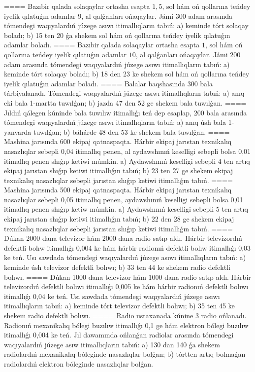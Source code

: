 ====
Bazıbir qalada solaqaylar ortasha esapta $1,5$, sol hám oń qollarına teńdey iyelik qılatuǵın adamlar $9$, al qalǵanları ońaqaylar. Jámi 300 adam arasında tómendegi waqıyalardıń júzege asıwı itimallıqların tabıń: a) keminde tórt solaqay boladı; b) 15 ten 20 ǵa shekem sol hám oń qollarına teńdey iyelik qılatuǵın adamlar boladı.
====
Bazıbir qalada solaqaylar ortasha esapta $1$, sol hám oń qollarına teńdey iyelik qılatuǵın adamlar $10$, al qalǵanları ońaqaylar. Jámi 200 adam arasında tómendegi waqıyalardıń júzege asıwı itimallıqların tabıń: a) keminde tórt solaqay boladı; b) 18 den 23 ke shekem sol hám oń qollarına teńdey iyelik qılatuǵın adamlar boladı.
====
Balalar baqshasında 300 bala tárbiyalanadı. Tómendegi waqıyalardıń júzege asıwı itimallıqların tabıń: a) anıq eki bala 1-martta tuwılǵan; b) jazda 47 den 52 ge shekem bala tuwılǵan.
====
Jıldıń qálegen kúninde bala tuwılıw itimallıǵı teń dep esaplap, 200 bala arasında tómendegi waqıyalardıń júzege asıwı itimallıqların tabıń: a) anıq úsh bala 1-yanvarda tuwılǵan; b) báhárde 48 den 53 ke shekem bala tuwılǵan.
====
Mashina jarısında 600 ekipaj qatnaspaqta. Hárbir ekipaj jarıstan texnikalıq nasazlıqlar sebepli 0,04 itimallıq penen, al aydawshınıń keselligi sebepli bolsa 0,01 itimallıq penen shıǵıp ketiwi múmkin. a) Aydawshınıń keselligi sebepli 4 ten artıq ekipaj jarıstan shıǵıp ketiwi itimallıǵın tabıń; b) 23 ten 27 ge shekem ekipaj texnikalıq nasazlıqlar sebepli jarıstan shıǵıp ketiwi itimallıǵın tabıń.
====
Mashina jarısında 500 ekipaj qatnaspaqta. Hárbir ekipaj jarıstan texnikalıq nasazlıqlar sebepli 0,05 itimallıq penen, aydawshınıń keselligi sebepli bolsa 0,01 itimallıq penen shıǵıp ketiw múmkin. a) Aydawshınıń keselligi sebepli 5 ten artıq ekipaj jarıstan shıǵıp ketiwi itimallıǵın tabıń; b) 22 den 28 ge shekem ekipaj texnikalıq nasazlıqlar sebepli jarıstan shıǵıp ketiwi itimallıǵın tabıń.
====
Dúkan 2000 dana televizor hám 2000 dana radio satıp aldı. Hárbir televizordıń defektli bolıw itimallıǵı 0,004 ke hám hárbir radionıń defektli bolıw itimallıǵı 0,03 ke teń. Usı sawdada tómendegi waqıyalardıń júzege asıwı itimallıqların tabıń: a) keminde úsh televizor defektli bolıwı; b) 33 ten 44 ke shekem radio defektli bolıwı.
====
Dúkan 1000 dana televizor hám 1000 dana radio satıp aldı. Hárbir televizordıń defektli bolıwı itimallıǵı 0,005 ke hám hárbir radionıń defektli bolıwı itimallıǵı 0,04 ke teń. Usı sawdada tómendegi waqıyalardıń júzege asıwı itimallıqların tabıń: a) keminde tórt televizor defektli bolıwı; b) 35 ten 45 ke shekem radio defektli bolıwı.
====
Radio ustaxanada kúnine 3 radio ońlanadı. Radionıń mexanikalıq bólegi buzılıw itimallıǵı 0,1 ge hám elektron bólegi buzılıw itimallıǵı 0,004 ke teń. Jıl dawamında ońlanǵan radiolar arasında tómendegi waqıyalardıń júzege asıw itimallıqların tabıń: a) 130 dan 140 ǵa shekem radiolardıń mexanikalıq bóleginde nasazlıqlar bolǵan; b) tórtten artıq bolmaǵan radiolardıń elektron bóleginde nasazlıqlar bolǵan.
